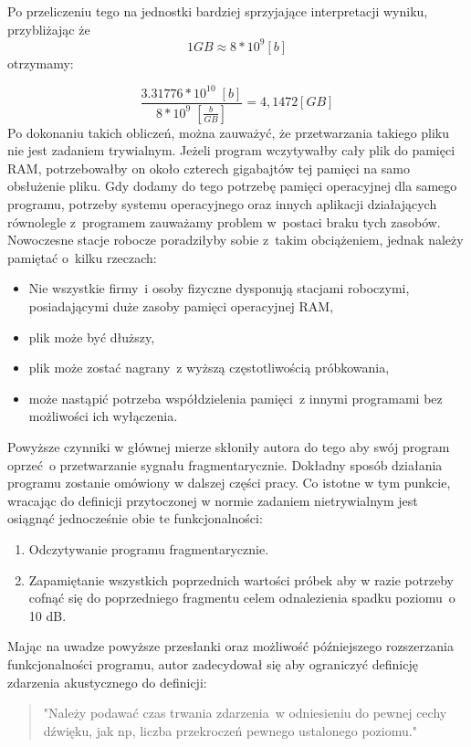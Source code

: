 \documentclass[eng,printmode]{mgr}
\begin{document}
Po przeliczeniu tego na jednostki bardziej sprzyjające interpretacji wyniku, przybliżając że $$1GB \approx 8*10^9 [b]$$ otrzymamy:


\begin{equation}
\frac{3.31776*10^10\;[b]}{8*10^9\;[\frac{b}{GB}]} = 4,1472 [GB]
\end{equation}
Po dokonaniu takich obliczeń, można zauważyć, że przetwarzania takiego pliku nie jest zadaniem trywialnym. Jeżeli program wczytywałby cały plik do pamięci RAM, potrzebowałby on około czterech gigabajtów tej pamięci na samo obsłużenie pliku. Gdy dodamy do tego potrzebę pamięci operacyjnej dla samego programu, potrzeby systemu operacyjnego oraz innych aplikacji działających równolegle z~programem zauważamy problem w~postaci braku tych zasobów. Nowoczesne stacje robocze poradziłyby sobie z~takim obciążeniem, jednak należy pamiętać o~kilku rzeczach:
\begin{itemize}
\item Nie wszystkie firmy~i osoby fizyczne dysponują stacjami roboczymi, posiadającymi duże zasoby pamięci operacyjnej RAM,
\item plik może być dłuższy,
\item plik może zostać nagrany~z wyższą częstotliwością próbkowania,
\item może nastąpić potrzeba współdzielenia pamięci~z innymi programami bez możliwości ich wyłączenia.
\end{itemize}

Powyższe czynniki w głównej mierze skłoniły autora do tego aby swój program oprzeć~o przetwarzanie sygnału fragmentarycznie. Dokładny sposób działania programu zostanie omówiony w dalszej części pracy. Co istotne w tym punkcie, wracając do definicji przytoczonej w normie \cite{PN-ISO-1996-1:2006} zadaniem nietrywialnym jest osiągnąć jednocześnie obie te funkcjonalności:
\begin{enumerate}
\item Odczytywanie programu fragmentarycznie.
\item Zapamiętanie wszystkich poprzednich wartości próbek aby w razie potrzeby cofnąć się do poprzedniego fragmentu celem odnalezienia spadku poziomu~o 10 dB.
\end{enumerate}

Mając na uwadze powyższe przesłanki oraz możliwość późniejszego rozszerzania funkcjonalności programu, autor zadecydował się aby ograniczyć definicję zdarzenia akustycznego do definicji:

\begin{quote}
"Należy podawać czas trwania zdarzenia~w odniesieniu do pewnej cechy dźwięku, jak np, liczba przekroczeń pewnego ustalonego poziomu."\cite{PN-ISO-1996-1:2006}
\end{quote}
\end{document}
